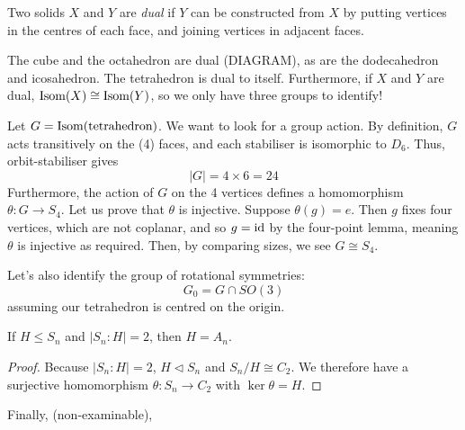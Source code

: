 \documentclass{../template/note}
\begin{document}
    \begin{definition}
        Two solids \(X\) and \(Y\) are \emph{dual} if \(Y\) can be constructed from \(X\) by putting vertices in the centres of each face, and joining vertices in adjacent faces.
    \end{definition}
    
    The cube and the octahedron are dual (DIAGRAM), as are the dodecahedron and icosahedron. The tetrahedron is dual to itself. Furthermore, if \(X\) and \(Y\) are dual, \(\operatorname{Isom}(X) \cong \operatorname{Isom}(Y)\), so we only have three groups to identify!
    
    \begin{example}[Tetrahedron]
        Let \(G = \operatorname{Isom}(\text{tetrahedron})\). We want to look for a group action. By definition, \(G\) acts transitively on the (4) faces, and each stabiliser is isomorphic to \(D_6\). Thus, orbit-stabiliser gives
        \[
            |G| = 4 \times 6 = 24
        \]
        Furthermore, the action of \(G\) on the 4 vertices defines a homomorphism \(\theta: G \to S_4\). Let us prove that \(\theta\) is injective. Suppose \(\theta(g) = e\). Then \(g\) fixes four vertices, which are not coplanar, and so \(g = \operatorname{id}\) by the four-point lemma, meaning \(\theta\) is injective as required. Then, by comparing sizes, we see \(G \cong S_4\).

        Let's also identify the group of rotational symmetries:
        \[
            G_0 = G \cap SO(3)
        \]
        assuming our tetrahedron is centred on the origin.
    \end{example}
    
    \begin{lemma}[Uniqueness of \(A_n\)]
        If \(H \leq S_n\) and \(|S_n:H|=2\), then \(H=A_n\).
    \end{lemma}
    
    \begin{proof}
        Because \(|S_n:H|=2\), \(H \triangleleft S_n\) and \(S_n/H \cong C_2\). We therefore have a surjective homomorphism \(\theta: S_n \to C_2\) with \(\ker \theta = H\).
    \end{proof}
    

    Finally, (non-examinable), 
\end{document}
